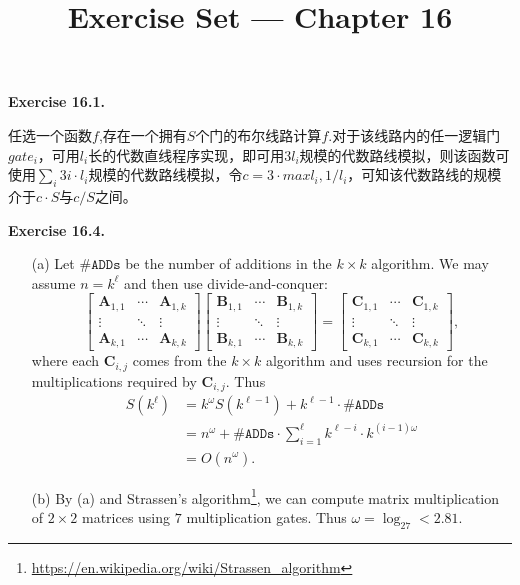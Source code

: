 \documentclass[a4paper]{article}
\title{Exercise Set --- Chapter 16}
\date{}
\newenvironment{exercise}[1]{
	\par
	\noindent\textbf{Exercise #1.}\quad
}{
	\par
	\bigskip
}
\begin{document}
    \maketitle

    \begin{exercise}{16.1}
		任选一个函数$f$,存在一个拥有$S$个门的布尔线路计算$f$.对于该线路内的任一逻辑门$gate_i$，可用$l_i$长的代数直线程序实现，即可用$3l_i$规模的代数路线模拟，则该函数可使用$\sum_i 3i\cdot l_i$规模的代数路线模拟，令$c=3\cdot max{l_i,1/l_i}$，可知该代数路线的规模介于$c\cdot S$与$c/S$之间。
	\end{exercise}

    \begin{exercise}{16.4}
        \begin{itemize}
            \item[(a)]
                Let $\#\texttt{ADDs}$ be the number of additions in the $k\times k$ algorithm.
                We may assume $n=k^\ell$ and then use divide-and-conquer:
                $$
                \begin{bmatrix}
                    \bm A_{1,1} & \cdots & \bm A_{1,k} \\
                    \vdots & \ddots & \vdots \\
                    \bm A_{k,1} & \cdots & \bm A_{k,k}
                \end{bmatrix}
                \begin{bmatrix}
                    \bm B_{1,1} & \cdots & \bm B_{1,k} \\
                    \vdots & \ddots & \vdots \\
                    \bm B_{k,1} & \cdots & \bm B_{k,k}
                \end{bmatrix}
                =
                \begin{bmatrix}
                    \bm C_{1,1} & \cdots & \bm C_{1,k} \\
                    \vdots & \ddots & \vdots \\
                    \bm C_{k,1} & \cdots & \bm C_{k,k}
                \end{bmatrix},
                $$
                where each $\bm C_{i,j}$ comes from the $k\times k$ algorithm and 
                uses recursion for the multiplications required by $\bm C_{i,j}$.
                Thus 
                \begin{align*}
                    S(k^\ell)
                    &=k^\omega S(k^{\ell-1})+k^{\ell-1}\cdot\#\texttt{ADDs}\\
                    &=n^{\omega}+\#\texttt{ADDs}\cdot\sum_{i=1}^\ell k^{\ell-i}\cdot k^{(i-1)\omega}\\
                    &=O(n^\omega).
                \end{align*}
            \item[(b)]
                By (a) and Strassen's algorithm\footnote{\url{https://en.wikipedia.org/wiki/Strassen_algorithm}}, we can compute
                matrix multiplication of $2\times2$ matrices using $7$ multiplication gates. Thus $\omega=\log_27<2.81$.
        \end{itemize}
    \end{exercise}
\end{document}
